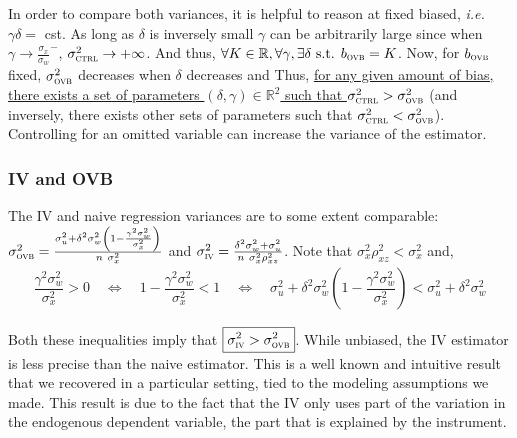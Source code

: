 \documentclass[a4paper, 11pt]{report}
\begin{document}
			In order to compare both variances, it is helpful to reason at fixed biased, \textit{i.e.} $\gamma \delta =$ cst. As long as $\delta$ is inversely small $\gamma$ can be arbitrarily large since when $\gamma \to  \frac{\sigma_{x}}{\sigma_{w}}^{-} $,  $\sigma_{\textsc{ctrl}}^{2} \to + \infty$. And thus, $\forall K \in \mathbb{R}, \forall \gamma, \exists \delta \text{ s.t. } b_{\textsc{ovb}} = K$. Now, for $b_{\textsc{ovb}}$ fixed, $\sigma_{\textsc{ovb}}^{2}$ decreases when $\delta$ decreases and 
			Thus, \ul{for any given amount of bias, there exists a set of parameters $(\delta, \gamma) \in \mathbb{R}^{2}$ such that $\sigma_{\textsc{ctrl}}^{2} > \sigma_{\textsc{ovb}}^{2}$} (and inversely, there exists other sets of parameters such that $\sigma_{\textsc{ctrl}}^{2} < \sigma_{\textsc{ovb}}^{2}$). Controlling for an omitted variable can increase the variance of the estimator.
			
			\subsubsection{IV and OVB}
			
			The IV and naive regression variances are to some extent comparable: $\sigma_{\textsc{ovb}}^{2}  = \frac{ \sigma_{u}^{2} +  \delta^{2} \sigma_{w}^{2} \left(1 - \frac{\gamma^{2}\sigma_{w}^{2}}{\sigma_{x}^{2}} \right)}{n \ \sigma_{x}^{2}}$ and $\sigma_{\textsc{iv}}^{2}  = \frac{\delta^{2}\sigma_{w}^{2} + \sigma_{u}^{2}}{n \ \sigma_{x}^{2} \rho_{xz}^{2}} $. Note that $\sigma_x^2 \rho_{xz}^{2} < \sigma_x^2$ and,
				~
				\begin{align*}
					  \dfrac{\gamma^{2}\sigma_{w}^{2}}{\sigma_{x}^{2}} > 0
						 \quad \Leftrightarrow \quad  
					 1 - \dfrac{\gamma^{2}\sigma_{w}^{2}}{\sigma_{x}^{2}} < 1
						\quad \Leftrightarrow \quad  
					\sigma_{u}^{2} + \delta^{2} \sigma_{w}^{2} \left( 1 - \dfrac{\gamma^{2}\sigma_{w}^{2}}{\sigma_{x}^{2}} \right) <  \sigma_{u}^{2} + \delta^{2} \sigma_{w}^{2} 
				\end{align*}
				
				Both these inequalities imply that $\boxed{\sigma_{\textsc{iv}}^{2} > \sigma_{\textsc{ovb}}^{2}}$. While unbiased, the IV estimator is less precise than the naive estimator. This is a well known and intuitive result that we recovered in a particular setting, tied to the modeling assumptions we made. This result is due to the fact that the IV only uses part of the variation in the endogenous dependent variable, the part that is explained by the instrument.
			
\end{document}
